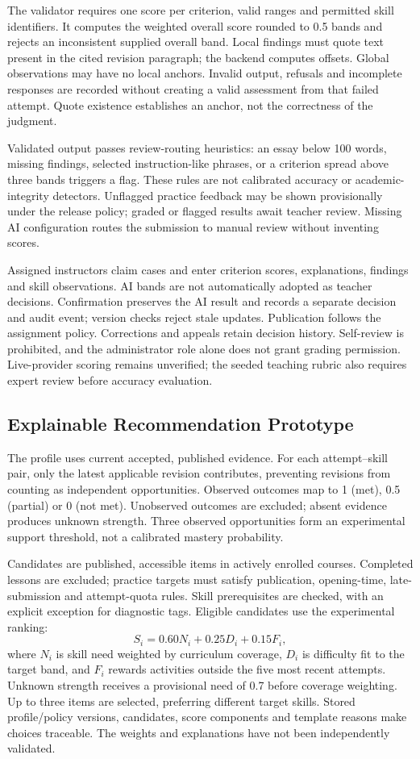 The validator requires one score per criterion, valid ranges and permitted
skill identifiers. It computes the weighted overall score rounded to
0.5 bands and rejects an inconsistent supplied overall band. Local findings
must quote text present in the cited revision paragraph; the backend
computes offsets. Global observations may have no local anchors.
Invalid output, refusals and incomplete responses are recorded without
creating a valid assessment from that failed attempt. Quote existence
establishes an anchor, not the correctness of the judgment.

Validated output passes review-routing heuristics: an essay below 100 words,
missing findings, selected instruction-like phrases, or a criterion spread
above three bands triggers a flag. These rules are not calibrated accuracy
or academic-integrity detectors. Unflagged practice feedback may be shown
provisionally under the release policy; graded or flagged results await
teacher review. Missing AI configuration routes the submission to manual
review without inventing scores.

Assigned instructors claim cases and enter criterion scores, explanations,
findings and skill observations. AI bands are not automatically adopted as
teacher decisions. Confirmation preserves the AI result and records a
separate decision and audit event; version checks reject stale updates.
Publication follows the assignment policy. Corrections and appeals retain
decision history. Self-review is prohibited, and the administrator role
alone does not grant grading permission. Live-provider scoring remains
unverified; the seeded teaching rubric also requires expert review before
accuracy evaluation.

\subsection{Explainable Recommendation Prototype}
The profile uses current accepted, published evidence. For each
attempt--skill pair, only the latest applicable revision contributes,
preventing revisions from counting as independent opportunities.
Observed outcomes map to 1 (met), 0.5 (partial) or 0 (not met).
Unobserved outcomes are excluded; absent evidence produces unknown strength.
Three observed opportunities form an experimental support threshold,
not a calibrated mastery probability.

Candidates are published, accessible items in actively enrolled courses.
Completed lessons are excluded; practice targets must satisfy publication,
opening-time, late-submission and attempt-quota rules. Skill prerequisites
are checked, with an explicit exception for diagnostic tags. Eligible
candidates use the experimental ranking:
\[
 S_i=0.60N_i+0.25D_i+0.15F_i,
\]
where $N_i$ is skill need weighted by curriculum coverage, $D_i$ is
difficulty fit to the target band, and $F_i$ rewards activities outside
the five most recent attempts. Unknown strength receives a provisional
need of 0.7 before coverage weighting. Up to three items are selected,
preferring different target skills. Stored profile/policy versions,
candidates, score components and template reasons make choices traceable.
The weights and explanations have not been independently validated.

